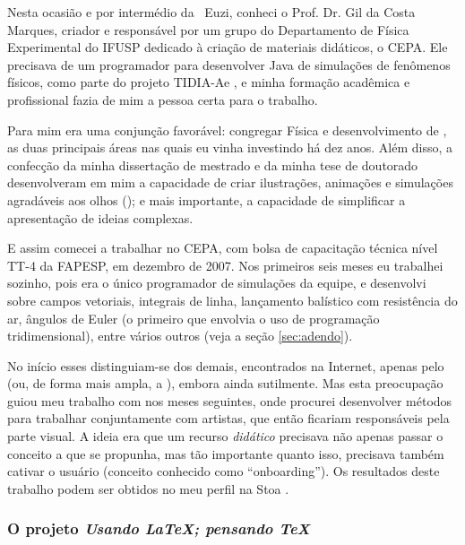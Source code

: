 Nesta ocasião e por intermédio da \profa\ Euzi, conheci o Prof. Dr. Gil da Costa Marques, criador e responsável por um grupo do Departamento de Física Experimental do IFUSP dedicado à criação de materiais didáticos, o CEPA. Ele precisava de um programador para desenvolver  Java de simulações de fenômenos físicos, como parte do projeto TIDIA-Ae \cite{tidia}, e minha formação acadêmica e profissional fazia de mim a pessoa certa para o trabalho.

Para mim era uma conjunção favorável: congregar Física e desenvolvimento de , as duas principais áreas nas quais eu vinha investindo há dez anos. Além disso, a confecção da minha dissertação de mestrado e da minha tese de doutorado desenvolveram em mim a capacidade de criar ilustrações, animações e simulações agradáveis aos olhos (); e mais importante, a capacidade de simplificar a apresentação de ideias complexas.

E assim comecei a trabalhar no CEPA, com bolsa de capacitação técnica nível TT-4 da FAPESP, em dezembro de 2007. Nos primeiros seis meses eu trabalhei sozinho, pois era o único programador de simulações da equipe, e desenvolvi  sobre campos vetoriais, integrais de linha, lançamento balístico com resistência do ar, ângulos de Euler (o primeiro que envolvia o uso de programação tridimensional), entre vários outros (veja a seção \ref{sec:adendo}).

No início esses  distinguiam-se dos demais, encontrados na Internet, apenas pelo  (ou, de forma mais ampla, a ), embora ainda sutilmente. Mas esta preocupação guiou meu trabalho com  nos meses seguintes, onde procurei desenvolver métodos para trabalhar conjuntamente com artistas, que então ficariam responsáveis pela parte visual. A ideia era que um recurso \emph{didático} precisava não apenas passar o conceito a que se propunha, mas tão importante quanto isso, precisava também cativar o usuário (conceito conhecido como ``onboarding''). Os resultados deste trabalho podem ser obtidos no meu perfil na  Stoa \cite{irpagnossin-stoa}.

\subsubsection{O projeto \textsl{Usando \LaTeX; pensando \TeX}}
\label{sec:latex}

